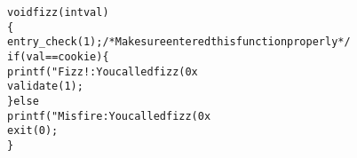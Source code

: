 \begin{alltt}
void fizz(int val)
\verb:{:
    entry_check(1);  /* Make sure entered this function properly */
    if (val == cookie) \verb:{:
        printf("Fizz!: You called fizz(0x%x)\verb:\n:", val);
        validate(1);
    \verb:}: else
        printf("Misfire: You called fizz(0x%x)\verb:\n:", val);
    exit(0);
\verb:}:
\end{alltt}
